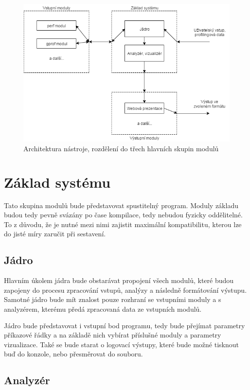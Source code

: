 \documentclass[czech,BP]{thesiskiv}
\begin{document}
\begin{figure}[h]
    \centering
    \includegraphics[interpolate,width=1.0\textwidth]{img/system_diagr.png}
    \caption{Architektura nástroje, rozdělení do třech hlavních skupin modulů}
    \label{obr:systemmodules}
\end{figure}

\section{Základ systému}

Tato skupina modulů bude představovat spustitelný program. Moduly základu budou tedy pevně svázány po čase kompilace, tedy nebudou fyzicky oddělitelné. To z důvodu, že je nutné mezi nimi zajistit maximální kompatibilitu, kterou lze do jisté míry zaručit při sestavení.

\subsection{Jádro}

Hlavním úkolem jádra bude obstarávat propojení všech modulů, které budou zapojeny do procesu zpracování vstupů, analýzy a následně formátování výstupu. Samotné jádro bude mít znalost pouze rozhraní se vstupními moduly a s analyzérem, kterému předá zpracovaná data ze vstupních modulů.

Jádro bude představovat i vstupní bod programu, tedy bude přejímat parametry příkazové řádky a na základě nich vybírat příslušné moduly a parametry vizualizace. Také se bude starat o logovací výstupy, které bude možné tisknout buď do konzole, nebo přesměrovat do souboru.

\subsection{Analyzér}
\end{document}
